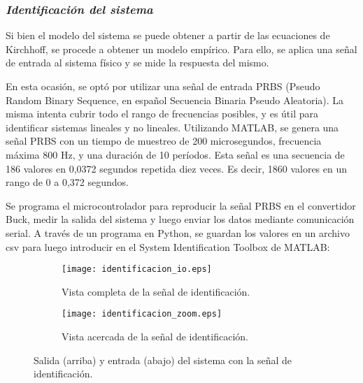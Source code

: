 \subsubsection*{\it{Identificación del sistema}}
\vspace{-0.25cm}
Si bien el modelo del sistema se puede obtener a partir de las ecuaciones de Kirchhoff, se procede
a obtener un modelo empírico. Para ello, se aplica una señal de entrada al sistema físico y se
mide la respuesta del mismo.

En esta ocasión, se optó por utilizar una señal de entrada PRBS
(Pseudo Random Binary Sequence, en español Secuencia Binaria Pseudo Aleatoria). La misma intenta
cubrir todo el rango de frecuencias posibles, y es útil para identificar sistemas lineales y no lineales.
Utilizando MATLAB, se genera una señal PRBS con un tiempo de muestreo de 200 microsegundos, frecuencia máxima
800 Hz, y una duración de 10 períodos. Esta señal es una secuencia de 186 valores en 0,0372 segundos repetida diez veces.
Es decir, 1860 valores en un rango de 0 a 0,372 segundos.

Se programa el microcontrolador para reproducir la señal PRBS en el convertidor Buck, medir la salida
del sistema y luego enviar los datos mediante comunicación serial. A través de un programa en Python, se guardan
los valores en un archivo csv para luego introducir en el System Identification Toolbox de MATLAB:


\begin{figure}[H]
    \centering

    \begin{subfigure}[b]{\textwidth}
        \centering
        \texttt{[image: identificacion\_io.eps]}
        \caption{Vista completa de la señal de identificación.}
        \label{fig:identificacion_io_gral}
    \end{subfigure}
    \begin{subfigure}[b]{\textwidth}
        \centering
        \texttt{[image: identificacion\_zoom.eps]}
        \caption{Vista acercada de la señal de identificación.}
        \label{fig:identificacion_io_zoom}
    \end{subfigure}

    \vspace{-0.25cm}
    \caption{Salida (arriba) y entrada (abajo) del sistema con la señal de identificación.}
    \label{fig:identificacion_io}
\end{figure}
\vspace{-0.5cm}

